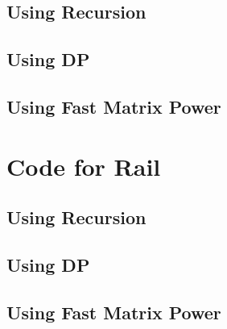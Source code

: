 \subsection{Using Recursion}


\subsection{Using DP}


\subsection{Using Fast Matrix Power}


\section{Code for Rail}
\label{Rail Code}
\subsection{Using Recursion}

\subsection{Using DP}

\subsection{Using Fast Matrix Power}



